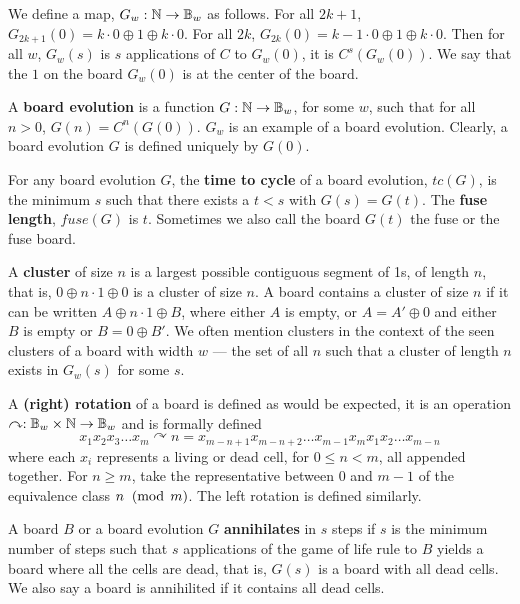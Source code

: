 \documentclass[12pt,letterpaper]{article}
\begin{document}
\begin{dfn}\label{mainBoard1Center}
  We define a map, $G_w: \mathbb{N}\rightarrow \mathbb{B}_w$ as follows. For all $2k+1$, $G_{2k+1}(0) = k\cdot 0 \oplus 1 \oplus k\cdot 0$. For all $2k$, $G_{2k}(0) = k-1\cdot 0 \oplus 1 \oplus k\cdot 0$. Then for all $w$, $G_w(s)$ is $s$ applications of $C$ to $G_w(0)$, it is $C^s(G_w(0))$. We say that the $1$ on the board $G_w(0)$ is at the center of the board.
\end{dfn}
\begin{dfn} \label{BoardEvolution}
  A {\bf board evolution} is a function $G:\mathbb{N} \rightarrow \mathbb{B}_w$, for some $w$, such that for all $n>0$, $G(n)=C^n(G(0))$. $G_w$ is an example of a board evolution. Clearly, a board evolution $G$ is defined uniquely by $G(0)$. 
\end{dfn}
\begin{dfn}\label{cycles}
  For any board evolution $G$, the {\bf time to cycle} of a board evolution, $tc(G)$, is the minimum $s$ such that there exists a $t<s$ with $G(s)=G(t)$. The {\bf fuse length}, $fuse(G)$ is $t$. Sometimes we also call the board $G(t)$ the fuse or the fuse board. 
\end{dfn}
\begin{dfn}\label{cluster}
  A {\bf cluster} of size $n$ is a largest possible contiguous segment of 1s, of length $n$,  that is, $0\oplus n\cdot 1\oplus 0$ is a cluster of size $n$. A board contains a cluster of size $n$ if it can be written $A\oplus n\cdot 1\oplus B$, where either $A$ is empty, or $A=A'\oplus 0$ and either $B$ is empty or $B=0\oplus B'$. We often mention clusters in the context of the seen clusters of a board with width $w$ --- the set of all $n$ such that a cluster of length $n$ exists in $G_w(s)$ for some $s$. 
\end{dfn}
\begin{dfn}\label{rotation}
  A {\bf (right) rotation} of a board is defined as would be expected, it is an operation $\curvearrowright: \mathbb{B}_w\times \mathbb{N}\rightarrow \mathbb{B}_w$ and is formally defined $$x_1x_2x_3\dots x_m\curvearrowright n = x_{m-n+1}x_{m-n+2}\dots x_{m-1}x_mx_1x_2\dots x_{m-n}$$ where each $x_i$ represents a living or dead cell, for $0\leq n<m$, all appended together. For $n\geq m$, take the representative between $0$ and $m-1$ of the equivalence class $n\;\;(\operatorname{mod}\;m)$. The left rotation is defined similarly.
\end{dfn} %
\begin{dfn}\label{annihilation}
  A board $B$ or a board evolution $G$ {\bf annihilates} in $s$ steps if $s$ is the minimum number of steps such that $s$ applications of the game of life rule to $B$ yields a board where all the cells are dead, that is, $G(s)$ is a board with all dead cells. We also say a board is annihilited if it contains all dead cells.
\end{dfn}
\end{document}
